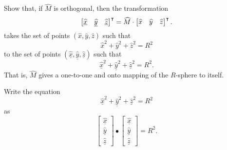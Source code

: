\documentclass[newpage,hints,handout]{ximera}
\begin{document}
\begin{problem}
  Show that, if $\hat{M}$ is orthogonal, then the transformation
  \[
  \begin{bmatrix}
    \underline{\widehat{x}} & \underline{\widehat{y}} & \underline{\widehat{z}}
  \end{bmatrix}^\intercal
  =\widehat M \cdot \begin{bmatrix}
    \widehat{x} & \widehat{y} & \widehat{z}
  \end{bmatrix}^\intercal.
  \]
  takes the set of points $\left(\hat{x},\hat{y},\hat{z}\right)$ such
  that
\[
\hat{x}^2 + \hat{y}^2 + \hat{z}^2 = R^2
\]
to the set of points
$\left(\underline{\hat{x}},\underline{\hat{y}},\underline{\hat{z}}\right)$
such that
\[
\underline{\hat{x}}^2 + \underline{\hat{y}}^{2} + \underline{\hat{z}}^{2}=R^2.
\]
That is, $\hat{M}$ gives a one-to-one and onto mapping of the $R$-sphere to
itself.
\begin{hint}
  Write the equation
  \[
  \underline{\hat{x}}^2 + \underline{\hat{y}}^{2} + \underline{\hat{z}}^{2}=R^2
  \]
  as
  \[
  \begin{bmatrix}
    \underline{\hat{x}} \\ \underline{\hat{y}} \\ \underline{\hat{z}}%
  \end{bmatrix}  
  \bullet
  \begin{bmatrix}
    \underline{\hat{x}} \\ \underline{\hat{y}} \\ \underline{\hat{z}}
  \end{bmatrix}=R^2.
  \]
\end{hint}


\end{problem}
\end{document}
